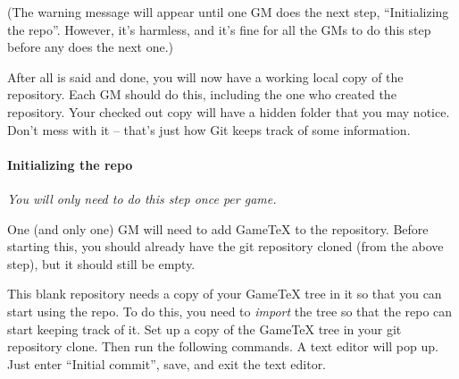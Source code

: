 \documentclass[green]{testgame}
\begin{document}

(The warning message will appear until one GM does the next step, ``Initializing the repo''. However, it's harmless, and it's fine for all the GMs to do this step before any does the next one.)

After all is said and done, you will now have a working local copy of the
repository.  Each GM should do this, including the one who created the
repository. Your checked out copy will have a hidden  folder that
you may notice.  Don't mess with it -- that's just how Git keeps track of some
information.

\paragraph*{Initializing the repo} \emph{You will only need to do this step once per game.}

One (and only one) GM will need to add GameTeX to the repository. Before starting this, you should already have the git repository cloned (from the above step), but it should still be empty.

This blank repository needs a copy of your GameTeX tree in it so that you can
start using the repo. To do this, you need to \emph{import} the tree so that
the repo can start keeping track of it. Set up a copy of the GameTeX tree in
your git repository clone. Then run the following commands. A text editor will
pop up. Just enter ``Initial commit'', save, and exit the text editor.

\end{document}
